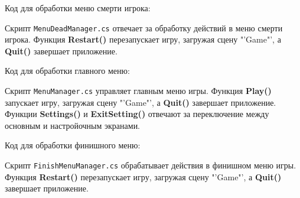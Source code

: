Код для обработки меню смерти игрока:                                          


Скрипт \texttt{MenuDeadManager.cs} отвечает за обработку действий
в меню смерти игрока. Функция \textbf{Restart()} перезапускает игру,
загружая сцену "'Game"', а \textbf{Quit()} завершает приложение.

Код для обработки главного меню:                                               


Скрипт \texttt{MenuManager.cs} управляет главным меню игры.
Функция \textbf{Play()} запускает игру, загружая сцену "'Game"',
а \textbf{Quit()} завершает приложение.
Функции \textbf{Settings()} и \textbf{ExitSetting()} отвечают
за переключение между основным и настройочным экранами.

Код для обработки финишного меню:                                              


Скрипт \texttt{FinishMenuManager.cs} обрабатывает действия
в финишном меню игры. Функция \textbf{Restart()} перезапускает игру,
загружая сцену "'Game"', а \textbf{Quit()} завершает приложение.

